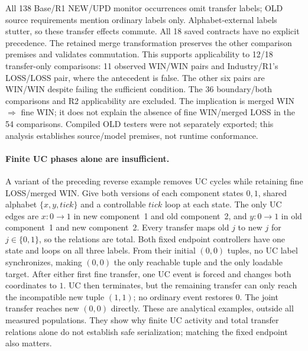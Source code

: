All 138 Base/R1 NEW/UPD monitor occurrences omit transfer labels; OLD source requirements mention ordinary labels only. Alphabet-external labels stutter, so these transfer effects commute. All 18 saved contracts have no explicit precedence. The retained merge transformation preserves the other comparison premises and validates commutation. This supports applicability to 12/18 transfer-only comparisons: 11 observed WIN/WIN pairs and Industry/R1's LOSS/LOSS pair, where the antecedent is false. The other six pairs are WIN/WIN despite failing the sufficient condition. The 36 boundary/both comparisons and R2 applicability are excluded. The implication is merged WIN $\Rightarrow$ fine WIN; it does not explain the absence of fine WIN/merged LOSS in the 54 comparisons. Compiled OLD testers were not separately exported; this analysis establishes source/model premises, not runtime conformance.

\paragraph{Finite UC phases alone are insufficient.}
A variant of the preceding reverse example removes UC cycles while retaining fine LOSS/merged WIN. Give both versions of each component states $0,1$, shared alphabet $\{x,y,tick\}$ and a controllable $tick$ loop at each state. The only UC edges are $x:0\to1$ in new component~1 and old component~2, and $y:0\to1$ in old component~1 and new component~2. Every transfer maps old $j$ to new $j$ for $j\in\{0,1\}$, so the relations are total. Both fixed endpoint controllers have one state and loops on all three labels. From their initial $(0,0)$ tuples, no UC label synchronizes, making $(0,0)$ the only reachable tuple and the only loadable target. After either first fine transfer, one UC event is forced and changes both coordinates to $1$. UC then terminates, but the remaining transfer can only reach the incompatible new tuple $(1,1)$; no ordinary event restores $0$. The joint transfer reaches new $(0,0)$ directly. These are analytical examples, outside all measured populations. They show why finite UC activity and total transfer relations alone do not establish safe serialization; matching the fixed endpoint also matters.


